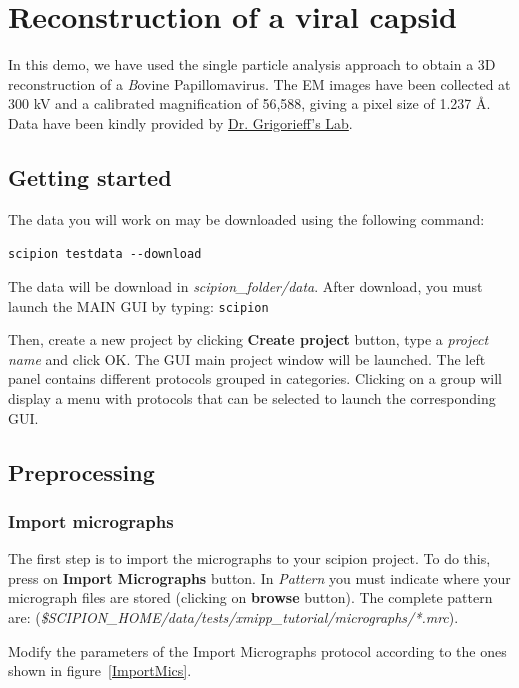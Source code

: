\documentclass[12pt]{article} %
\begin{document}
\section{Reconstruction of a viral capsid}

In this demo, we have used the single particle analysis approach to obtain
a 3D reconstruction of a {\emph Bovine Papillomavirus}. The EM images have been
collected at 300 kV and a calibrated magnification of 56,588, giving a pixel
size  of 1.237 \AA  \citep{Wolf2010}. Data have been kindly
provided by \href{http://grigoriefflab.janelia.org/}{Dr. Grigorieff’s Lab}.

\subsection{Getting started}

The data you will work on may be downloaded using the following command:

\verb+scipion testdata --download+

The data will be download in \emph {scipion\_folder/data}. After download, you must
launch the MAIN GUI by typing: \verb+scipion+

Then, create a new project by clicking \textbf{Create project} button, type a 
\textit{project name} and click OK. The GUI main project window will be launched.
The left panel contains different protocols grouped in categories. Clicking on
a group will display a menu with protocols that can be selected to launch the
corresponding GUI.

\subsection{Preprocessing}

\subsubsection{Import micrographs}

The first step is to import the micrographs to your scipion project. To do this,
press on \textbf{Import Micrographs} button. In \textit{Pattern}  you must indicate
where your micrograph files are stored (clicking on \textbf{browse} button). The 
complete pattern are:
(\emph {\$SCIPION\_HOME/data/tests/xmipp\_tutorial/micrographs/*.mrc}).

Modify the parameters of the Import Micrographs protocol according to the ones
shown in figure~\ref{ImportMics}.
\end{document}
